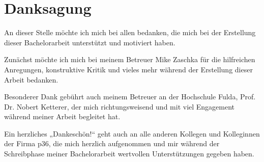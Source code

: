 
\chapter*{Danksagung}

An dieser Stelle möchte ich mich bei allen bedanken, die mich bei der Erstellung dieser Bachelorarbeit unterstützt und motiviert haben.

Zunächst möchte ich mich bei meinem Betreuer Mike Zaschka für die hilfreichen Anregungen, konstruktive Kritik und vieles mehr während der Erstellung dieser Arbeit bedanken. 

Besonderer Dank gebührt auch meinem Betreuer an der Hochschule Fulda, Prof. Dr. Nobert Ketterer, der mich richtungsweisend und mit viel Engagement während meiner Arbeit begleitet hat.

Ein herzliches „Dankeschön!“ geht auch an alle anderen Kollegen und Kolleginnen der Firma p36, die mich herzlich aufgenommen und mir während der Schreibphase meiner Bachelorarbeit wertvollen Unterstützungen gegeben haben.



